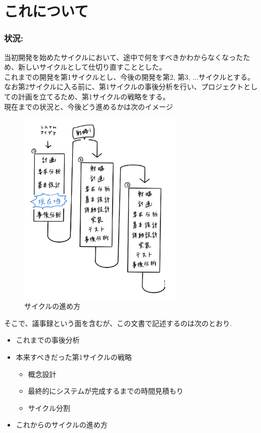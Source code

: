 \section{これについて} \label{sec:introduction}

\subsubsection{状況:}

当初開発を始めたサイクルにおいて、途中で何をすべきかわからなくなったため、新しいサイクルとして仕切り直すこととした。 \\
これまでの開発を第1サイクルとし、今後の開発を第2, 第3, ...サイクルとする。 \\
なお第2サイクルに入る前に、第1サイクルの事後分析を行い、プロジェクトとしての計画を立てるため、第1サイクルの戦略をする。 \\

現在までの状況と、今後どう進めるかは次のイメージ \\

\begin{figure}[H]
  \centering
  \includegraphics[width=80mm]{sections/cycle.jpg}
  \caption{サイクルの進め方}
  \label{fig:output}
\end{figure}

そこで、議事録という面を含むが、この文書で記述するのは次のとおり.

\begin{itemize}
  \item これまでの事後分析
  \item 本来すべきだった第1サイクルの戦略
  \begin{itemize}
    \item 概念設計
    \item 最終的にシステムが完成するまでの時間見積もり
    \item サイクル分割
  \end{itemize}
  \item これからのサイクルの進め方
\end{itemize}

